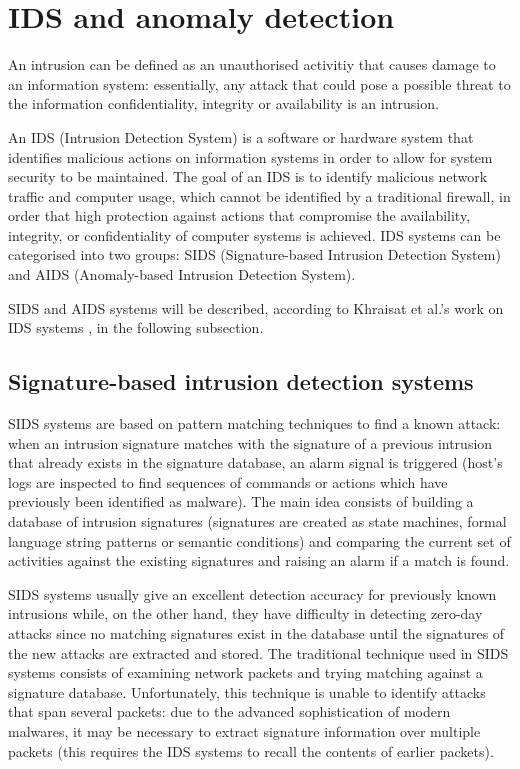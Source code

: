 \section{IDS and anomaly detection}
\label{chap:IDS}
An intrusion can be defined as an unauthorised activitiy that causes damage to an information system: essentially, any attack that could pose a possible threat to the information confidentiality, integrity or availability is an intrusion.

An IDS (Intrusion Detection System) is a software or hardware system that identifies malicious actions on information systems in order to allow for system security to be maintained.
The goal of an IDS is to identify malicious network traffic and computer usage, which cannot be identified by a traditional firewall, in order that high protection against actions that compromise the availability, integrity, or confidentiality of computer systems is achieved.
IDS systems can be categorised into two groups: SIDS (Signature-based Intrusion Detection System) and AIDS (Anomaly-based Intrusion Detection System).

SIDS and AIDS systems will be described, according to Khraisat et al.'s work on IDS systems \parencite{Khraisat}, in the following subsection.

\subsection{Signature-based intrusion detection systems}
SIDS systems are based on pattern matching techniques to find a known attack: when an intrusion signature matches with the signature of a previous intrusion that already exists in the signature database, an alarm signal is triggered (host’s logs are inspected to find sequences of commands or actions which have previously been identified as malware).
The main idea consists of building a database of intrusion signatures (signatures are created as state machines, formal language string patterns or semantic conditions) and comparing the current set of activities against the existing signatures and raising an alarm if a match is found.

SIDS systems usually give an excellent detection accuracy for previously known intrusions \parencite{Kreibich} while, on the other hand, they have difficulty in detecting zero-day attacks since no matching signatures exist in the database until the signatures of the new attacks are extracted and stored.
The traditional technique used in SIDS systems consists of examining network packets and trying matching against a signature database.
Unfortunately, this technique is unable to identify attacks that span several packets: due to the advanced sophistication of modern malwares, it may be necessary to extract signature information over multiple packets (this requires the IDS systems to recall the contents of earlier packets).

